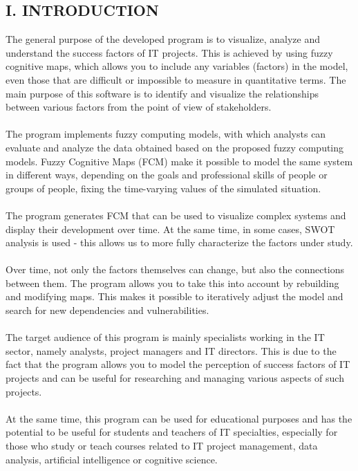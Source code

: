 \documentclass{article}
\begin{document}
\begin{minipage}{0.49\textwidth}
\begin{center}
            \chapter{I. INTRODUCTION}
        \end{center}
        The general purpose of the developed program is to visualize, analyze and understand the success factors of IT projects. This is achieved by using fuzzy cognitive maps, which allows you to include any variables (factors) in the model, even those that are difficult or impossible to measure in quantitative terms.  The main purpose of this software is to identify and visualize the relationships between various factors from the point of view of stakeholders.\\
        ~\\
        The program implements fuzzy computing models, with which analysts can evaluate and analyze the data obtained based on the proposed fuzzy computing models. Fuzzy Cognitive Maps (FCM) make it possible to model the same system in different ways, depending on the goals and professional skills of people or groups of people, fixing the time-varying values of the simulated situation.\\
        ~\\
        The program generates FCM that can be used to visualize complex systems and display their development over time. At the same time, in some cases, SWOT analysis is used - this allows us to more fully characterize the factors under study.\\
        ~\\
        Over time, not only the factors themselves can change, but also the connections between them. The program allows you to take this into account by rebuilding and modifying maps. This makes it possible to iteratively adjust the model and search for new dependencies and vulnerabilities.\\
        ~\\
        The target audience of this program is mainly specialists working in the IT sector, namely analysts, project managers and IT directors. This is due to the fact that the program allows you to model the perception of success factors of IT projects and can be useful for researching and managing various aspects of such projects.\\
        ~\\
        At the same time, this program can be used for educational purposes and has the potential to be useful for students and teachers of IT specialties, especially for those who study or teach courses related to IT project management, data analysis, artificial intelligence or cognitive science.\\

\end{minipage}
\end{document}
